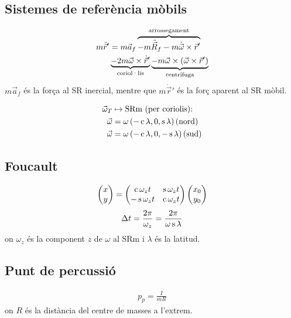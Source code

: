 \subsection{Sistemes de referència mòbils}
\begin{align}
\begin{aligned}
    m \ddot{\vec{r}}' &=  m \vec{a}_{f} \overbrace{- m \ddot{\vec{R}}_{f} - m \dot{\vec{\omega}} \times \vec{r}'}^{\text{arrossegament}} \\
    & \underbrace{- 2m \vec{\omega} \times \dot{\vec{r}}'}_{\text{coriol·lis}} \underbrace{- m \vec{\omega} \times \left( \vec{\omega} \times \vec{r}' \right)}_{\text{centrífuga}} \\
\end{aligned}
\end{align}
$m \vec{a}_{f}$ és la for\c{c}a al SR inercial, mentre que $m \ddot{\vec{r}}'$ és la for\c{c} aparent al SR mòbil.

\begin{align}
\begin{aligned}
    \vec{\omega}_{T} &\mapsto \text{SRm (per coriolis): } \\
    \vec{\omega} &= \omega \left( -\operatorname{c} \lambda, 0, \operatorname{s} \lambda \right) \text{(nord)} \\
    \vec{\omega} &= \omega \left( -\operatorname{c} \lambda, 0, -\operatorname{s} \lambda \right) \text{(sud)}
\end{aligned}
\end{align}

\subsection{Foucault}
\begin{align}
    \begin{pmatrix} x \\ y \end{pmatrix} = \begin{pmatrix} \operatorname{c} \omega_{z} t & \operatorname{s} \omega_{z} t \\ -\operatorname{s} \omega_{z} t & \operatorname{c} \omega_{z} t \end{pmatrix} \begin{pmatrix} x_{0} \\ y_{0} \end{pmatrix}
\end{align}
\begin{align}
    \Delta t = \frac{2 \pi}{ \omega_{z}} = \frac{2 \pi}{ \omega \operatorname{s} \lambda}
\end{align}
on $\omega_{z}$ és la component $z$ de $\omega$ al SRm i $\lambda$ és la latitud.

\subsection{Punt de percussió}
\begin{align}
    p_{p} = \frac{I}{m R}
\end{align}
on $R$ és la distància del centre de masses a l'extrem.
